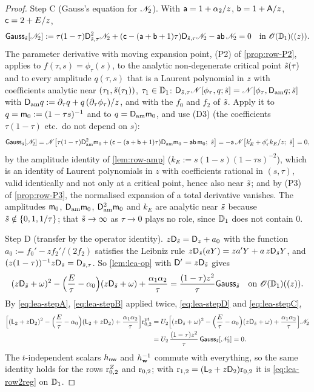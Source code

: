 \begin{proof}
Step C (Gauss's equation for $\mathscr{N}_{2}$). With $\mathsf{a} = 1+\alpha_2/z$, $\mathsf{b} = 1+\mathsf{A}/z$, $\mathsf{c} = 2+E/z$,
\begin{equation}
\label{eq:lea-stepC}
\mathsf{Gauss}_{\tilde{s}}[\mathscr{N}_{2}] := \tau(1-\tau)\mathsf{D}_{\tilde{s},\tau}^2\mathscr{N}_{2} + (\mathsf{c} - (\mathsf{a}+\mathsf{b}+1)\tau)\mathsf{D}_{\tilde{s},\tau}\mathscr{N}_{2} - \mathsf{a}\mathsf{b}\,\mathscr{N}_{2} = 0\quad\text{in }\mathscr{O}(\mathbb{D}_{1})((z)).
\end{equation}
The parameter derivative with moving expansion point, (P2) of \cref{prop:row-P2}, applies to $f(\tau,s) = \phi_\tau(s)$, to the analytic non-degenerate critical point $\tilde{s}(\tau)$ and to every amplitude $q(\tau,s)$ that is a Laurent polynomial in $z$ with coefficients analytic near $(\tau_1,\tilde{s}(\tau_1))$, $\tau_1\in\mathbb{D}_{1}$: $\mathsf{D}_{\tilde{s},\tau}\mathscr{N}[\phi_\tau,q;\tilde{s}] = \mathscr{N}[\phi_\tau,\mathsf{D}_{\mathrm{am}} q;\tilde{s}]$ with $\mathsf{D}_{\mathrm{am}} q := \partial_\tau q + q\,(\partial_\tau\phi_\tau)/z$, and with the $f_0$ and $f_2$ of $\tilde{s}$. Apply it to $q = \mathsf{m}_0 := (1-\tau s)^{-1}$ and to $q = \mathsf{D}_{\mathrm{am}}\mathsf{m}_0$, and use (D3) (the coefficients $\tau(1-\tau)$ etc.\ do not depend on $s$):
\[
\mathsf{Gauss}_{\tilde{s}}[\mathscr{N}_{2}] = \mathscr{N}\bigl[\tau(1-\tau)\mathsf{D}_{\mathrm{am}}^2\mathsf{m}_0 + (\mathsf{c}-(\mathsf{a}+\mathsf{b}+1)\tau)\mathsf{D}_{\mathrm{am}}\mathsf{m}_0 - \mathsf{a}\mathsf{b}\,\mathsf{m}_0;\ \tilde{s}\bigr] = -\mathsf{a}\,\mathscr{N}\bigl[k_E' + \phi_\tau'k_E/z;\ \tilde{s}\bigr] = 0,
\]
by the amplitude identity of \cref{lem:row-amp} ($k_E := s(1-s)(1-\tau s)^{-2}$), which is an identity of Laurent polynomials in $z$ with coefficients rational in $(s,\tau)$, valid identically and not only at a critical point, hence also near $\tilde{s}$; and by (P3) of \cref{prop:row-P3}, the normalised expansion of a total derivative vanishes. The amplitudes $\mathsf{m}_0$, $\mathsf{D}_{\mathrm{am}}\mathsf{m}_0$, $\mathsf{D}_{\mathrm{am}}^2\mathsf{m}_0$ and $k_E$ are analytic near $\tilde{s}$ because $\tilde{s}\notin\{0,1,1/\tau\}$; that $\tilde{s}\to\infty$ as $\tau\to 0$ plays no role, since $\mathbb{D}_{1}$ does not contain $0$.

Step D (transfer by the operator identity). $z\mathsf{D}_{\tilde{s}} = \mathsf{D}_{z} + a_0$ with the function $a_0 := f_0' - zf_2'/(2f_2)$ satisfies the Leibniz rule $z\mathsf{D}_{\tilde{s}}(aY) = za'Y + a\,z\mathsf{D}_{\tilde{s}} Y$, and $(z(1-\tau))^{-1}z\mathsf{D}_{\tilde{s}} = \mathsf{D}_{\tilde{s},\tau}$. So \cref{lem:lea-op} with $\mathsf{D}' = z\mathsf{D}_{\tilde{s}}$ gives
\begin{equation}
\label{eq:lea-stepD}
(z\mathsf{D}_{\tilde{s}}+\omega)^2 - \Bigl(\frac{E}{\tau}-\alpha_0\Bigr)(z\mathsf{D}_{\tilde{s}}+\omega) + \frac{\alpha_1\alpha_2}{\tau} = \frac{(1-\tau)z^2}{\tau}\mathsf{Gauss}_{\tilde{s}}\quad\text{on }\mathscr{O}(\mathbb{D}_{1})((z)).
\end{equation}
By \eqref{eq:lea-stepA}, \eqref{eq:lea-stepB} applied twice, \eqref{eq:lea-stepD} and \eqref{eq:lea-stepC},
\begin{align*}
\Bigl[(\mathsf{L}_2+z\mathsf{D}_2)^2 - \Bigl(\frac{E}{\tau}-\alpha_0\Bigr)(\mathsf{L}_2+z\mathsf{D}_2) + \frac{\alpha_1\alpha_2}{\tau}\Bigr]\mathrm{r}^{\mathrm{pt}}_{0,2}
&= U_2\Bigl[(z\mathsf{D}_{\tilde{s}}+\omega)^2 - \Bigl(\frac{E}{\tau}-\alpha_0\Bigr)(z\mathsf{D}_{\tilde{s}}+\omega) + \frac{\alpha_1\alpha_2}{\tau}\Bigr]\mathscr{N}_{2}\\
&= U_2\,\frac{(1-\tau)z^2}{\tau}\,\mathsf{Gauss}_{\tilde{s}}[\mathscr{N}_{2}] = 0 .
\end{align*}
The $t$-independent scalars $h_{\mathsf{nw}}$ and $h_{\mathbf{w}}^{-1}$ commute with everything, so the same identity holds for the rows $\mathrm{r}^{Z}_{0,2}$ and $\mathrm{r}_{0,2}$; with $\mathrm{r}_{1,2} = (\mathsf{L}_2+z\mathsf{D}_2)\mathrm{r}_{0,2}$ it is \eqref{eq:lea-row2reg} on $\mathbb{D}_{1}$.


\end{proof}

